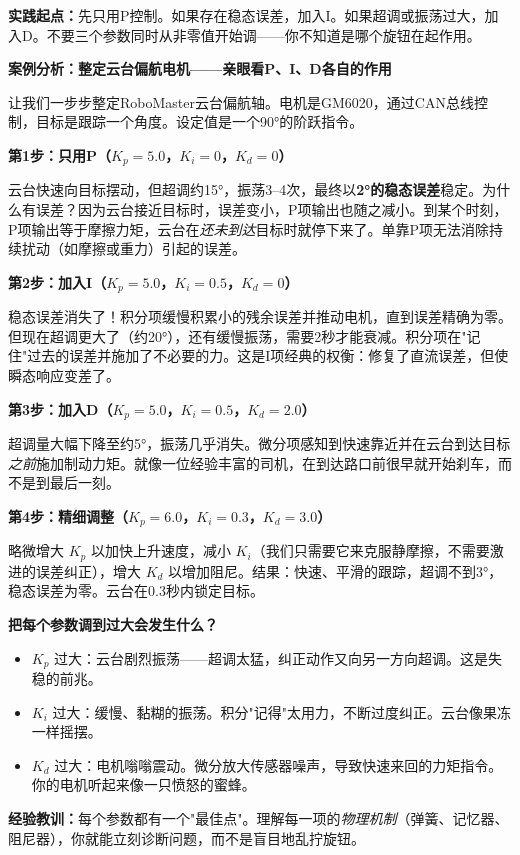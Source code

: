 \textbf{实践起点：}先只用P控制。如果存在稳态误差，加入I。如果超调或振荡过大，加入D。不要三个参数同时从非零值开始调——你不知道是哪个旋钮在起作用。

\vspace{0.5em}
\begin{mdframed}[linewidth=1pt, innertopmargin=10pt, innerbottommargin=10pt]
\textbf{案例分析：整定云台偏航电机——亲眼看P、I、D各自的作用}

\vspace{0.3em}
让我们一步步整定RoboMaster云台偏航轴。电机是GM6020，通过CAN总线控制，目标是跟踪一个角度。设定值是一个90°的阶跃指令。

\textbf{第1步：只用P（$K_p = 5.0$，$K_i = 0$，$K_d = 0$）}

云台快速向目标摆动，但超调约15°，振荡3--4次，最终以\textbf{2°的稳态误差}稳定。为什么有误差？因为云台接近目标时，误差变小，P项输出也随之减小。到某个时刻，P项输出等于摩擦力矩，云台在\textit{还未到达}目标时就停下来了。单靠P项无法消除持续扰动（如摩擦或重力）引起的误差。

\textbf{第2步：加入I（$K_p = 5.0$，$K_i = 0.5$，$K_d = 0$）}

稳态误差消失了！积分项缓慢积累小的残余误差并推动电机，直到误差精确为零。但现在超调更大了（约20°），还有缓慢振荡，需要2秒才能衰减。积分项在"记住"过去的误差并施加了不必要的力。这是I项经典的权衡：修复了直流误差，但使瞬态响应变差了。

\textbf{第3步：加入D（$K_p = 5.0$，$K_i = 0.5$，$K_d = 2.0$）}

超调量大幅下降至约5°，振荡几乎消失。微分项感知到快速靠近并在云台到达目标\textit{之前}施加制动力矩。就像一位经验丰富的司机，在到达路口前很早就开始刹车，而不是到最后一刻。

\textbf{第4步：精细调整（$K_p = 6.0$，$K_i = 0.3$，$K_d = 3.0$）}

略微增大 $K_p$ 以加快上升速度，减小 $K_i$（我们只需要它来克服静摩擦，不需要激进的误差纠正），增大 $K_d$ 以增加阻尼。结果：快速、平滑的跟踪，超调不到3°，稳态误差为零。云台在0.3秒内锁定目标。

\textbf{把每个参数调到过大会发生什么？}
\begin{itemize}[nosep]
    \item $K_p$ 过大：云台剧烈振荡——超调太猛，纠正动作又向另一方向超调。这是失稳的前兆。
    \item $K_i$ 过大：缓慢、黏糊的振荡。积分"记得"太用力，不断过度纠正。云台像果冻一样摇摆。
    \item $K_d$ 过大：电机嗡嗡震动。微分放大传感器噪声，导致快速来回的力矩指令。你的电机听起来像一只愤怒的蜜蜂。
\end{itemize}

\textbf{经验教训：}每个参数都有一个"最佳点"。理解每一项的\textit{物理机制}（弹簧、记忆器、阻尼器），你就能立刻诊断问题，而不是盲目地乱拧旋钮。
\end{mdframed}

